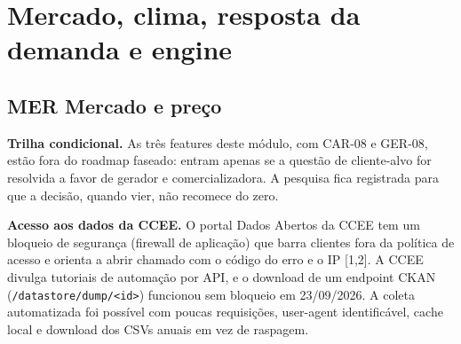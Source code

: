 
\section{Mercado, clima, resposta da demanda e engine}

\subsection{MER \textperiodcentered{} Mercado e preço}

\begin{nota}
\textbf{Trilha condicional.} As três features deste módulo, com CAR-08 e
GER-08, estão fora do roadmap faseado: entram apenas se a questão de
cliente-alvo for resolvida a favor de gerador e comercializadora. A pesquisa
fica registrada para que a decisão, quando vier, não recomece do zero.
\end{nota}

\begin{nota}
\textbf{Acesso aos dados da CCEE.} O portal Dados Abertos da CCEE tem um bloqueio
de segurança (firewall de aplicação) que barra clientes fora da política de
acesso e orienta a abrir chamado com o código do erro e o IP [1,2]. A
CCEE divulga tutoriais de automação por API, e o download de um endpoint
CKAN (\texttt{/datastore/dump/<id>}) funcionou sem bloqueio em 23/09/2026. A
coleta automatizada foi possível com poucas requisições, user-agent
identificável, cache local e download dos CSVs anuais em vez de raspagem.
\end{nota}

